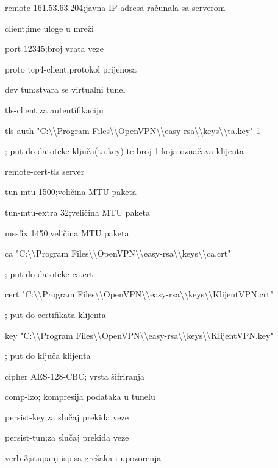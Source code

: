 {\selectfont
remote 161.53.63.204\hfill;javna IP adresa računala sa serverom

client\hfill;ime uloge u mreži

port 12345\hfill;broj vrata veze

proto tcp4-client\hfill;protokol prijenosa

dev tun\hfill;stvara se virtualni tunel

tls-client\hfill;za autentifikaciju

tls-auth "C:\textbackslash \textbackslash Program Files\textbackslash \textbackslash OpenVPN\textbackslash \textbackslash easy-rsa\textbackslash \textbackslash keys\textbackslash \textbackslash ta.key" 1\hfill

; put do datoteke ključa(ta.key) te broj 1 koja označava klijenta

remote-cert-tls server

tun-mtu 1500\hfill;veličina MTU paketa

tun-mtu-extra 32\hfill;veličina MTU paketa

mssfix 1450\hfill;veličina MTU paketa

ca "C:\textbackslash \textbackslash Program Files\textbackslash \textbackslash OpenVPN\textbackslash \textbackslash easy-rsa\textbackslash \textbackslash keys\textbackslash \textbackslash ca.crt"\hfill

; put do datoteke ca.crt

cert "C:\textbackslash \textbackslash Program Files\textbackslash \textbackslash OpenVPN\textbackslash \textbackslash easy-rsa\textbackslash \textbackslash keys\textbackslash \textbackslash KlijentVPN.crt"\hfill

; put do certifikata klijenta

key "C:\textbackslash \textbackslash Program Files\textbackslash \textbackslash OpenVPN\textbackslash \textbackslash easy-rsa\textbackslash \textbackslash keys\textbackslash \textbackslash KlijentVPN.key"\hfill

; put do ključa klijenta

cipher AES-128-CBC\hfill; vrsta šifriranja

comp-lzo\hfill; kompresija podataka u tunelu

persist-key\hfill;za slučaj prekida veze

persist-tun\hfill;za slučaj prekida veze

verb 3\hfill;stupanj ispisa grešaka i upozorenja

}\bigbreak

